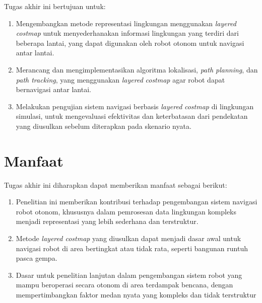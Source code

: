 Tugas akhir ini bertujuan untuk:
\begin{enumerate}
    \item Mengembangkan metode representasi lingkungan menggunakan \emph{layered} \emph{costmap} untuk menyederhanakan informasi lingkungan yang terdiri dari beberapa lantai, yang dapat digunakan oleh robot otonom untuk navigasi antar lantai.
    \item Merancang dan mengimplementasikan algoritma lokalisasi, \emph{path planning}, dan \emph{path tracking}, yang menggunakan \emph{layered} \emph{costmap} agar robot dapat bernavigasi antar lantai.
    \item Melakukan pengujian sistem navigasi berbasis \emph{layered} \emph{costmap} di lingkungan simulasi, untuk mengevaluasi efektivitas dan keterbatasan dari pendekatan yang diusulkan sebelum diterapkan pada skenario nyata.
\end{enumerate}

\section{Manfaat}
\label{sec:Manfaat}

Tugas akhir ini diharapkan dapat memberikan manfaat sebagai berikut:
\begin{enumerate}
  \item Penelitian ini memberikan kontribusi terhadap pengembangan sistem navigasi robot otonom, khususnya dalam pemrosesan data lingkungan kompleks menjadi representasi yang lebih sederhana dan terstruktur.
  \item Metode \emph{layered costmap} yang diusulkan dapat menjadi dasar awal untuk navigasi robot di area bertingkat atau tidak rata, seperti bangunan runtuh pasca gempa.
  \item Dasar untuk penelitian lanjutan dalam pengembangan sistem robot yang mampu beroperasi secara otonom di area terdampak bencana, dengan mempertimbangkan faktor medan nyata yang kompleks dan tidak terstruktur
\end{enumerate}
